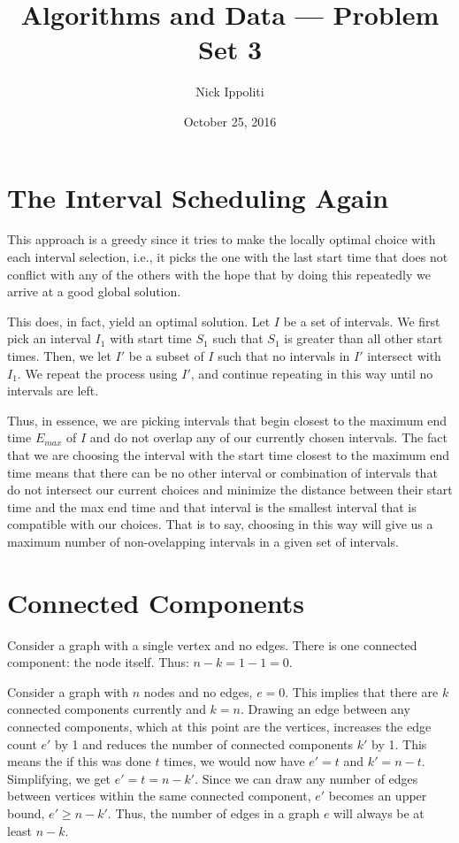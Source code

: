 \documentclass[14pt, letterpaper]{article}
\title{Algorithms and Data --- Problem Set 3}
\author{Nick Ippoliti}
\date{October 25, 2016}
\begin{document}
\begin{titlepage}
\maketitle
\end{titlepage}

\section{The Interval Scheduling Again}
This approach is a greedy since it tries to make the locally optimal choice
with each interval selection, i.e., it picks the one with the last start time
that does not conflict with any of the others with the hope that by doing this
repeatedly we arrive at a good global solution.

This does, in fact, yield an optimal solution. Let $I$ be a set of intervals.
We first pick an interval $I_1$ with start time $S_1$ such that $S_1$ is 
greater than all other start times. Then, we let $I'$ be a subset of $I$ such
that no intervals in $I'$ intersect with $I_1$. We repeat the process using 
$I'$, and continue repeating in this way until no intervals are left.

Thus, in essence, we are picking intervals that begin closest to the maximum
end time $E_{max}$ of $I$ and do not overlap any of our currently chosen 
intervals. The fact that we are choosing the interval with the start time 
closest to the maximum end time means that there can be no other interval or
combination of intervals that do not intersect our current choices and minimize
the distance between their start time and the max end time and that interval is
the smallest interval that is compatible with our choices. That is to say,
choosing in this way will give us a maximum number of non-ovelapping intervals 
in a given set of intervals.

\section{Connected Components}
Consider a graph with a single vertex and no edges. There is one connected
component: the node itself. Thus: $n - k = 1 - 1 = 0$.

Consider a graph with $n$ nodes and no edges, $e = 0$. This implies that there
are $k$ connected components currently and $k = n$. Drawing an edge between any
connected components, which at this point are the vertices, increases the edge
count $e'$ by 1 and reduces the number of connected components $k'$ by 1. This
means the if this was done $t$ times, we would now have $e' = t$ and 
$k' = n - t$. Simplifying, we get $e' = t = n - k'$. Since we can draw any
number of edges between vertices within the same connected component, $e'$
becomes an upper bound, $e' \geq n - k'$. Thus, the number of edges in a graph
$e$ will always be at least $n - k$.
\end{document}
